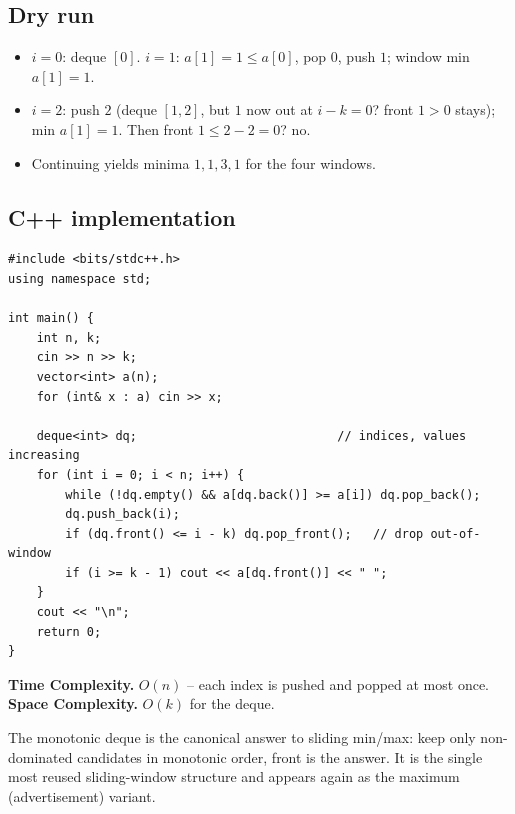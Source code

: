 \subsection*{Dry run}


\begin{itemize}
  \item $i{=}0$: deque $[0]$. $i{=}1$: $a[1]{=}1\le a[0]$, pop $0$, push
        $1$; window min $a[1]=1$.
  \item $i{=}2$: push $2$ (deque $[1,2]$, but $1$ now out at $i-k=0$?
        front $1>0$ stays); min $a[1]=1$. Then front $1\le2-2=0$? no.
  \item Continuing yields minima $1,1,3,1$ for the four windows.
\end{itemize}

\subsection*{C++ implementation}

\begin{lstlisting}
#include <bits/stdc++.h>
using namespace std;

int main() {
    int n, k;
    cin >> n >> k;
    vector<int> a(n);
    for (int& x : a) cin >> x;

    deque<int> dq;                            // indices, values increasing
    for (int i = 0; i < n; i++) {
        while (!dq.empty() && a[dq.back()] >= a[i]) dq.pop_back();
        dq.push_back(i);
        if (dq.front() <= i - k) dq.pop_front();   // drop out-of-window
        if (i >= k - 1) cout << a[dq.front()] << " ";
    }
    cout << "\n";
    return 0;
}
\end{lstlisting}

\begin{complexitybox}
\textbf{Time Complexity.} $O(n)$ -- each index is pushed and popped at most
once. \textbf{Space Complexity.} $O(k)$ for the deque.
\end{complexitybox}

\begin{takeawaybox}
The monotonic deque is the canonical answer to sliding min/max: keep only
non-dominated candidates in monotonic order, front is the answer. It is the
single most reused sliding-window structure and appears again as the
maximum (advertisement) variant.
\end{takeawaybox}
